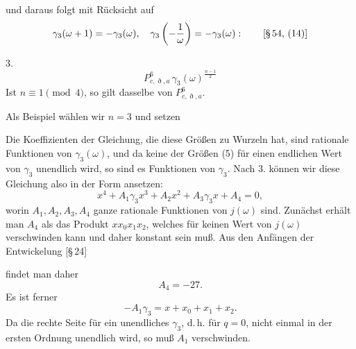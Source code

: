 und daraus folgt mit Rücksicht auf
\[
\gamma_3(\omega+1) = -\gamma_3(\omega), \quad
\gamma_3\left(-\frac{1}{\omega}\right) = -\gamma_3(\omega): \qquad \text{[§\,54, (14)]}
\]

3. 
\[
P^{6}_{c,\eth,a}\,\gamma_3(\omega)^{\frac{n-1}{2}}
\]
 Ist $n \equiv 1 \pmod{4}$, so gilt dasselbe von $P^{6}_{c,\eth,a}$.

Als Beispiel wählen wir $n=3$ und setzen


Die Koeffizienten der Gleichung, die diese Größen zu Wurzeln hat,
sind rationale Funktionen von $\gamma_3(\omega)$, und da keine der
Größen (5) für einen endlichen Wert von $\gamma_3$ unendlich wird,
so sind es  Funktionen von $\gamma_3$. Nach 3. können wir
diese Gleichung also in der Form ansetzen:
\[
x^4 + A_1\gamma_3 x^3 + A_2 x^2 + A_3 \gamma_3 x + A_4 = 0,
\]
worin $A_1, A_2, A_3, A_4$ ganze rationale Funktionen von $j(\omega)$
sind. Zunächst erhält man $A_4$ als das Produkt $x x_0 x_1 x_2$,
welches für keinen Wert von $j(\omega)$ verschwinden kann und daher
konstant sein muß. Aus den Anfängen der Entwickelung [§\,24]


findet man daher
\[
A_4 = -27.
\]
Es ist ferner
\[
-A_1\gamma_3 = x + x_0 + x_1 + x_2.
\]
Da die rechte Seite für ein unendliches $\gamma_3$, d.\,h. für $q=0$,
nicht einmal in der ersten Ordnung unendlich wird, so muß $A_1$
verschwinden.
